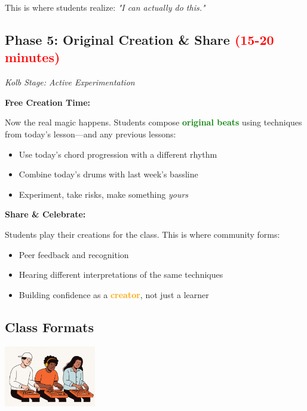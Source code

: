 \documentclass[11pt,letterpaper]{article}
\newcommand{\greentext}[1]{\textcolor{green}{\textbf{#1}}}
\newcommand{\orangetext}[1]{\textcolor{orange}{\textbf{#1}}}
\begin{document}
This is where students realize: \textit{"I can actually do this."}

\subsection*{Phase 5: Original Creation \& Share \texorpdfstring{\textcolor{red}{(15-20 minutes)}}{(15-20 minutes)}}
\textit{Kolb Stage: Active Experimentation}

\textbf{Free Creation Time:}

Now the real magic happens. Students compose \greentext{original beats} using techniques from today's lesson—and any previous lessons:

\begin{itemize}[leftmargin=*]
\item Use today's chord progression with a different rhythm
\item Combine today's drums with last week's bassline
\item Experiment, take risks, make something \textit{yours}
\end{itemize}

\textbf{Share \& Celebrate:}

Students play their creations for the class. This is where community forms:
\begin{itemize}[leftmargin=*]
\item Peer feedback and recognition
\item Hearing different interpretations of the same techniques
\item Building confidence as a \orangetext{creator}, not just a learner
\end{itemize}

\vspace{0.5cm}

\subsection*{Class Formats}

\begin{center}
\includegraphics[width=0.3\textwidth]{Illustrations/Band.png}
\end{center}
\end{document}

